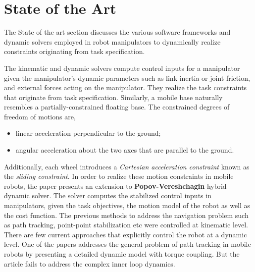 
\chapter{State of the Art}



%

The State of the art section discusses the various software frameworks and dynamic solvers employed in robot manipulators to dynamically realize constraints originating from task specification. 

The kinematic and dynamic solvers compute control inputs for a manipulator given the manipulator’s dynamic parameters such as link inertia or joint friction, and external forces acting on the manipulator. They realize the task constraints that originate from task specification. Similarly, a mobile base naturally resembles a partially-constrained floating base. The constrained degrees of freedom of motions are,
\begin{itemize}
	\item linear acceleration perpendicular to the ground;
	\item angular acceleration about the two axes that are parallel to the ground.
\end{itemize}

Additionally, each wheel introduces a \textit{Cartesian acceleration constraint} known as the \textit{sliding constraint}. In order to realize these motion constraints in mobile robots, the paper presents an extension to \textbf{Popov-Vereshchagin} hybrid dynamic solver. The solver computes the stabilized control inputs in manipulators, given the task objectives, the motion model of the robot as well as the cost function. The previous methods to address the navigation problem such as path tracking, point-point stabilization etc were controlled at kinematic level. There are few current approaches that explicitly control the robot at a dynamic level. One of the papers addresses the general problem of path tracking in mobile robots by presenting a detailed dynamic model with torque coupling. But the article fails to address the complex inner loop dynamics.

